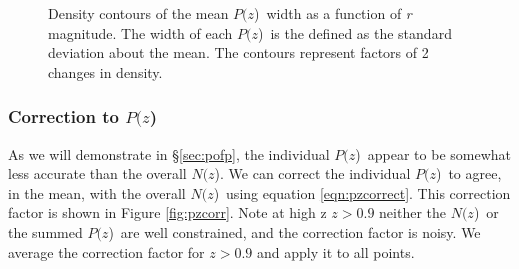 \documentclass[preprint]{aastex}
\newcommand{\pofz}{$P(z$)}
\newcommand{\Nofz}{$N(z$)}
\begin{document}
\begin{figure}[p]\centering
    \caption{Density contours of the mean \pofz\ width as a function of {\it r} magnitude. 
The width of each \pofz\ is the defined as the standard deviation about the mean. 
The contours represent factors of 2 changes in density.}
    \label{fig:pzwidth}
    \vspace{2em}
\end{figure}

\subsubsection{Correction to \pofz} \label{sec:pzcorr}

As we will demonstrate in \S \ref{sec:pofp}, the individual \pofz\ appear to be
somewhat less accurate than the overall \Nofz.  We can correct the individual
\pofz\ to agree, in the mean, with the overall \Nofz\ using equation
\ref{eqn:pzcorrect}.  This correction factor is shown in Figure
\ref{fig:pzcorr}.  Note at high z $z > 0.9$ neither the \Nofz\ or the summed
\pofz\ are well constrained, and the correction factor is noisy.  We average
the correction factor for $z > 0.9$ and apply it to all points. 
\end{document}
